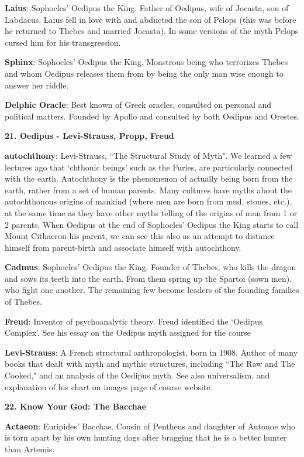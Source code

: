 \documentclass{scrartcl}
\begin{document}
\begin{multicols*}{3}
{\bf Laius}: Sophocles' Oedipus the King. Father of Oedipus, wife of Jocasta, son of Labdacus. Laius fell in love with and abducted the son of Pelops (this was before he returned to Thebes and married Jocasta). In some versions of the myth Pelops cursed him for his transgression.

{\bf Sphinx}: Sophocles' Oedipus the King. Monstrous being who terrorizes Thebes and whom Oedipus releases them from by being the only man wise enough to answer her riddle.

{\bf Delphic Oracle}: Best known of Greek oracles, consulted on personal and political matters. Founded by Apollo and consulted by both Oedipus and Orestes.


{\bf 21. Oedipus - Levi-Strauss, Propp, Freud}

{\bf autochthony}: Levi-Strauss, ``The Structural Study of Myth". We learned a few lectures ago that `chthonic beings' such as the Furies, are particularly connected with the earth. Autochthony is the phenomenon of actually being born from the earth, rather from a set of human parents. Many cultures have myths about the autochthonous origins of mankind (where men are born from mud, stones, etc.), at the same time as they have other myths telling of the origins of man from 1 or 2 parents. When Oedipus at the end of Sophocles' Oedipus the King starts to call Mount Cithaeron his parent, we can see this also as an attempt to distance himself from parent-birth and associate himself with autochthony.

{\bf Cadmus}: Sophocles' Oedipus the King. Founder of Thebes, who kills the dragon and sows its teeth into the earth. From them spring up the Spartoi (sown men), who fight one another. The remaining few become leaders of the founding families of Thebes.

{\bf Freud}: Inventor of psychoanalytic theory. Freud identified the `Oedipus Complex'. See his essay on the Oedipus myth assigned for the course

{\bf Levi-Strauss}: A French structural anthropologist, born in 1908. Author of many books that dealt with myth and mythic structures, including ``The Raw and The Cooked," and an analysis of the Oedipus myth. See also universalism, and explanation of his chart on images page of course website.


{\bf 22. Know Your God: The Bacchae}

{\bf Actaeon}: Euripides' Bacchae. Cousin of Pentheus and daughter of Autonoe who is torn apart by his own hunting dogs after bragging that he is a better hunter than Artemis.


\end{multicols*}
\end{document}

